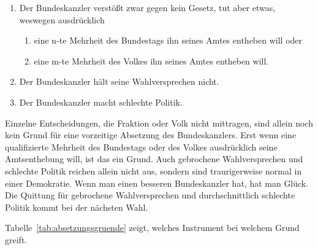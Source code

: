\begin{enumerate}
\begin{enumerate}
\begin{enumerate}
                \item Der Kanzler begeht Hochverrat, indem er z.~B. vorsätzlich Staatsgeheimnisse verrät.
                \item Der Kanzler begeht ein Verbrechen wie z.~B. Mord, das ihn nach allgemeinem Rechtsempfinden für eine Kanzlerschaft disqualifiziert.
            \end{enumerate}
          \item Verstöße, die während der Kanzlerschaft geahndet werden können, ohne die Kanzlerschaft zu beeinträchtigen, wenn z.~B. nur eine Geldstrafe fällig ist.
          \item Verstöße, die nicht so schwerwiegend sind, dass die Kanzlerschaft nicht fortgesetzt werden könnte, aber erst nach der Kanzlerschaft geahndet werden können. (Z.~B. weil eine Gefängnisstrafe droht, die aber nicht sofort vollstreckt werden muss.)
        \end{enumerate}

    \item Der Bundeskanzler verstößt zwar gegen kein Gesetz, tut aber etwas, weswegen ausdrücklich
        \begin{enumerate}[label=\alph*)]
            \item eine n-te Mehrheit des Bundestags ihn seines Amtes entheben will oder
            \item eine m-te Mehrheit des Volkes ihn seines Amtes entheben will.
        \end{enumerate}
    \item Der Bundeskanzler hält seine Wahlversprechen nicht.
    \item Der Bundeskanzler macht schlechte Politik.
\end{enumerate}

Einzelne Entscheidungen, die Fraktion oder Volk nicht mittragen, sind allein noch kein Grund für eine vorzeitige Absetzung des Bundeskanzlers.
Erst wenn eine qualifizierte Mehrheit des Bundestags oder des Volkes ausdrücklich seine Amtsenthebung will, ist das ein Grund.
Auch gebrochene Wahlversprechen und schlechte Politik reichen allein nicht aus, sondern sind traurigerweise normal in einer Demokratie.
Wenn man einen besseren Bundeskanzler hat, hat man Glück.
Die Quittung für gebrochene Wahlversprechen und durchschnittlich schlechte Politik kommt bei der nächsten Wahl.

Tabelle~\ref{tab:absetzungsgruende} zeigt, welches Instrument bei welchem Grund greift.


